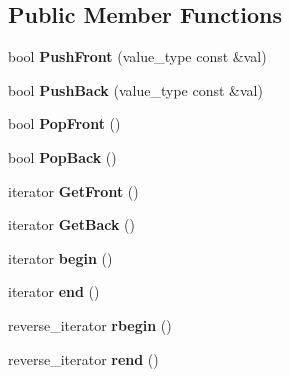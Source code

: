 \subsection*{Public Member Functions}
\begin{DoxyCompactItemize}
\item 
\hypertarget{classlsf_1_1container_1_1Queue_af8748217a040e186374b6fc32e5ec4d6}{
bool {\bfseries PushFront} (value\_\-type const \&val)}
\label{classlsf_1_1container_1_1Queue_af8748217a040e186374b6fc32e5ec4d6}

\item 
\hypertarget{classlsf_1_1container_1_1Queue_a8d8f0a7b29d7e9f1ce7f82183bee9131}{
bool {\bfseries PushBack} (value\_\-type const \&val)}
\label{classlsf_1_1container_1_1Queue_a8d8f0a7b29d7e9f1ce7f82183bee9131}

\item 
\hypertarget{classlsf_1_1container_1_1Queue_abe9b5dd91cfff989feca527a2787a40c}{
bool {\bfseries PopFront} ()}
\label{classlsf_1_1container_1_1Queue_abe9b5dd91cfff989feca527a2787a40c}

\item 
\hypertarget{classlsf_1_1container_1_1Queue_a7f238ddd2e85671a8c58cb924714a6d2}{
bool {\bfseries PopBack} ()}
\label{classlsf_1_1container_1_1Queue_a7f238ddd2e85671a8c58cb924714a6d2}

\item 
\hypertarget{classlsf_1_1container_1_1Queue_acf9393d59e7e4c1d148674643287c8a8}{
iterator {\bfseries GetFront} ()}
\label{classlsf_1_1container_1_1Queue_acf9393d59e7e4c1d148674643287c8a8}

\item 
\hypertarget{classlsf_1_1container_1_1Queue_a9094ca7823cf1bb8c13940874efc9472}{
iterator {\bfseries GetBack} ()}
\label{classlsf_1_1container_1_1Queue_a9094ca7823cf1bb8c13940874efc9472}

\item 
\hypertarget{classlsf_1_1container_1_1Queue_ae2096b81113eab4cc836e01d4dfefd75}{
iterator {\bfseries begin} ()}
\label{classlsf_1_1container_1_1Queue_ae2096b81113eab4cc836e01d4dfefd75}

\item 
\hypertarget{classlsf_1_1container_1_1Queue_a6227553357dec1aaef1852951e78dde8}{
iterator {\bfseries end} ()}
\label{classlsf_1_1container_1_1Queue_a6227553357dec1aaef1852951e78dde8}

\item 
\hypertarget{classlsf_1_1container_1_1Queue_a67edeb737521c285aeef34b56ecbe5f1}{
reverse\_\-iterator {\bfseries rbegin} ()}
\label{classlsf_1_1container_1_1Queue_a67edeb737521c285aeef34b56ecbe5f1}

\item 
\hypertarget{classlsf_1_1container_1_1Queue_a28050fe09381f85da0912572876e2626}{
reverse\_\-iterator {\bfseries rend} ()}
\label{classlsf_1_1container_1_1Queue_a28050fe09381f85da0912572876e2626}

\end{DoxyCompactItemize}
